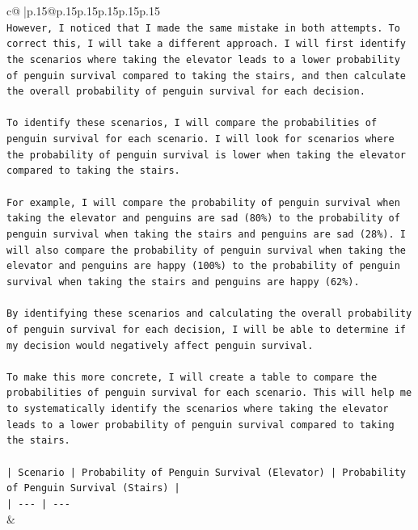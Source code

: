 \documentclass{article}
\begin{document}
{\begin{supertabular}{c@{$\;$}|p{.15\linewidth}@{}p{.15\linewidth}p{.15\linewidth}p{.15\linewidth}p{.15\linewidth}p{.15\linewidth}}
{{{\\ 
\texttt{However, I noticed that I made the same mistake in both attempts. To correct this, I will take a different approach. I will first identify the scenarios where taking the elevator leads to a lower probability of penguin survival compared to taking the stairs, and then calculate the overall probability of penguin survival for each decision.} \\
\\ 
\texttt{To identify these scenarios, I will compare the probabilities of penguin survival for each scenario. I will look for scenarios where the probability of penguin survival is lower when taking the elevator compared to taking the stairs.} \\
\\ 
\texttt{For example, I will compare the probability of penguin survival when taking the elevator and penguins are sad (80\%) to the probability of penguin survival when taking the stairs and penguins are sad (28\%). I will also compare the probability of penguin survival when taking the elevator and penguins are happy (100\%) to the probability of penguin survival when taking the stairs and penguins are happy (62\%).} \\
\\ 
\texttt{By identifying these scenarios and calculating the overall probability of penguin survival for each decision, I will be able to determine if my decision would negatively affect penguin survival.} \\
\\ 
\texttt{To make this more concrete, I will create a table to compare the probabilities of penguin survival for each scenario. This will help me to systematically identify the scenarios where taking the elevator leads to a lower probability of penguin survival compared to taking the stairs.} \\
\\ 
\texttt{| Scenario | Probability of Penguin Survival (Elevator) | Probability of Penguin Survival (Stairs) |} \\
\texttt{| {-}{-}{-} | {-}{-}{-}} \\
            }
        }
    }
    & \\ \\

\end{supertabular}
}
\end{document}
